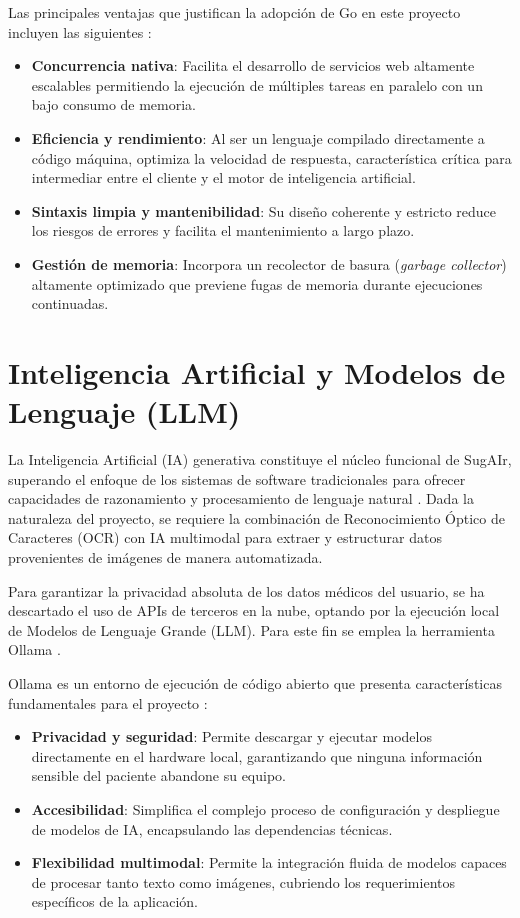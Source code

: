 Las principales ventajas que justifican la adopción de Go en este proyecto incluyen las siguientes \cite{donovan_go}:
\begin{itemize}
    \item \textbf{Concurrencia nativa}: Facilita el desarrollo de servicios web altamente escalables permitiendo la ejecución de múltiples tareas en paralelo con un bajo consumo de memoria.
    \item \textbf{Eficiencia y rendimiento}: Al ser un lenguaje compilado directamente a código máquina, optimiza la velocidad de respuesta, característica crítica para intermediar entre el cliente y el motor de inteligencia artificial.
    \item \textbf{Sintaxis limpia y mantenibilidad}: Su diseño coherente y estricto reduce los riesgos de errores y facilita el mantenimiento a largo plazo.
    \item \textbf{Gestión de memoria}: Incorpora un recolector de basura (\textit{garbage collector}) altamente optimizado que previene fugas de memoria durante ejecuciones continuadas.
\end{itemize}

\section{Inteligencia Artificial y Modelos de Lenguaje (LLM)}
La Inteligencia Artificial (IA) generativa constituye el núcleo funcional de SugAIr, superando el enfoque de los sistemas de software tradicionales para ofrecer capacidades de razonamiento y procesamiento de lenguaje natural \cite{iso_ia}. Dada la naturaleza del proyecto, se requiere la combinación de Reconocimiento Óptico de Caracteres (OCR) con IA multimodal para extraer y estructurar datos provenientes de imágenes de manera automatizada.

Para garantizar la privacidad absoluta de los datos médicos del usuario, se ha descartado el uso de APIs de terceros en la nube, optando por la ejecución local de Modelos de Lenguaje Grande (LLM). Para este fin se emplea la herramienta Ollama \cite{ollama_official}.

Ollama es un entorno de ejecución de código abierto que presenta características fundamentales para el proyecto \cite{ollama_official, osl_ollama}:
\begin{itemize}
    \item \textbf{Privacidad y seguridad}: Permite descargar y ejecutar modelos directamente en el hardware local, garantizando que ninguna información sensible del paciente abandone su equipo.
    \item \textbf{Accesibilidad}: Simplifica el complejo proceso de configuración y despliegue de modelos de IA, encapsulando las dependencias técnicas.
    \item \textbf{Flexibilidad multimodal}: Permite la integración fluida de modelos capaces de procesar tanto texto como imágenes, cubriendo los requerimientos específicos de la aplicación.
\end{itemize}

